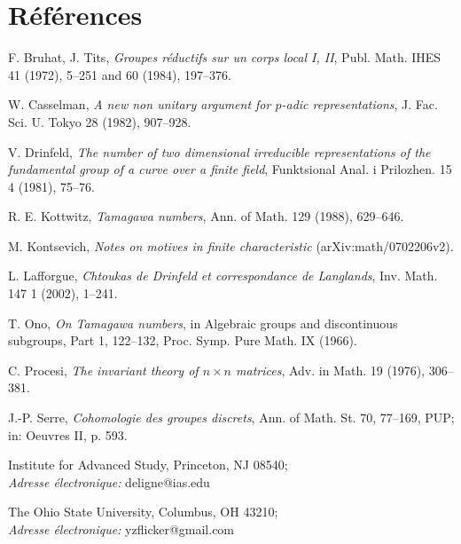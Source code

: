 \documentclass[10pt]{article}
\theoremstyle{deligne}
\begin{document}
\section*{Références}
\begin{description}[leftmargin=2.7em,labelwidth=2.4em,style=nextline]
\item[{[BT]}] F. Bruhat, J. Tits, \emph{Groupes réductifs sur un corps local I, II}, Publ. Math. IHES 41 (1972), 5--251 and 60 (1984), 197--376.
\item[{[C]}] W. Casselman, \emph{A new non unitary argument for $p$-adic representations}, J. Fac. Sci. U. Tokyo 28 (1982), 907--928.
\item[{[D]}] V. Drinfeld, \emph{The number of two dimensional irreducible representations of the fundamental group of a curve over a finite field}, Funktsional Anal. i Prilozhen. 15 4 (1981), 75--76.
\item[{[K]}] R. E. Kottwitz, \emph{Tamagawa numbers}, Ann. of Math. 129 (1988), 629--646.
\item[{[Ko]}] M. Kontsevich, \emph{Notes on motives in finite characteristic} (arXiv:math/0702206v2).
\item[{[L]}] L. Lafforgue, \emph{Chtoukas de Drinfeld et correspondance de Langlands}, Inv. Math. 147 1 (2002), 1--241.
\item[{[O]}] T. Ono, \emph{On Tamagawa numbers}, in Algebraic groups and discontinuous subgroups, Part 1, 122--132, Proc. Symp. Pure Math. IX (1966).
\item[{[P]}] C. Procesi, \emph{The invariant theory of $n\times n$ matrices}, Adv. in Math. 19 (1976), 306--381.
\item[{[S]}] J.-P. Serre, \emph{Cohomologie des groupes discrets}, Ann. of Math. St. 70, 77--169, PUP; in: Oeuvres II, p. 593.
\end{description}

Institute for Advanced Study, Princeton, NJ 08540;\\
\emph{Adresse électronique:} deligne@ias.edu

The Ohio State University, Columbus, OH 43210;\\
\emph{Adresse électronique:} yzflicker@gmail.com
\end{document}
